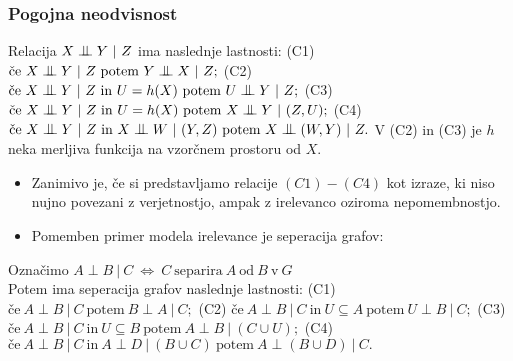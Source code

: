 \documentclass{beamer}
\newcommand{\cond}{\mathrel{\text{\scalebox{1.07}{$\perp\mkern-10mu\perp$}}}}
\begin{document}
\begin{frame}
    \frametitle{Pogojna neodvisnost}
        Relacija $ X \cond Y ~|~ Z$ ima naslednje lastnosti: \newline \newline
        (C1) $\text{če} ~X \cond Y ~|~ Z~ \text{potem}~ Y \cond X ~|~ Z;$\newline \newline
        (C2) $\text{če} ~X \cond Y ~|~ Z~ \text{in} ~U = h(X) ~\text{potem}~ U \cond Y ~|~ Z;$\newline \newline
        (C3) $\text{če} ~X \cond Y ~|~ Z~ \text{in} ~U = h(X) ~\text{potem}~ X \cond Y ~|~ (Z,U);$\newline \newline
        (C4) $\text{če} ~X \cond Y ~|~ Z~ \text{in} ~X \cond W ~|~ (Y,Z) ~\text{potem}~ X \cond (W,Y) ~|~ Z.$\newline \newline
        V (C2) in (C3) je $h$ neka merljiva funkcija na vzorčnem prostoru od $X$.

\end{frame}
\begin{frame}
    \begin{itemize}
        \item Zanimivo je, če si predstavljamo relacije $(C1)-(C4)$ kot izraze,
        ki niso nujno povezani z verjetnostjo, ampak z irelevanco oziroma nepomembnostjo.
        \item Pomemben primer modela irelevance je seperacija grafov:
    \end{itemize}
    Označimo $A \perp B ~|~ C ~ \Longleftrightarrow ~ C ~\text{separira}~ A~ \text{od} ~B~ \text{v}~ G$ \\
    Potem ima seperacija grafov naslednje lastnosti:\newline \newline
    (C1) $\text{če} ~A \perp B ~|~ C~ \text{potem}~ B \perp A ~|~ C;$\newline \newline
    (C2) $\text{če} ~A \perp B ~|~ C~ \text{in} ~U \subseteq A ~\text{potem}~ U \perp B ~|~ C;$\newline \newline
    (C3) $\text{če} ~A \perp B ~|~ C~ \text{in} ~U \subseteq B ~\text{potem}~ A \perp B ~|~ (C \cup U);$\newline \newline
    (C4) $\text{če} ~A \perp B ~|~ C~ \text{in} ~A \perp D ~|~ (B \cup C) ~\text{potem}~ A \perp (B \cup D) ~|~ C.$\newline \newline

\end{frame}
\end{document}
